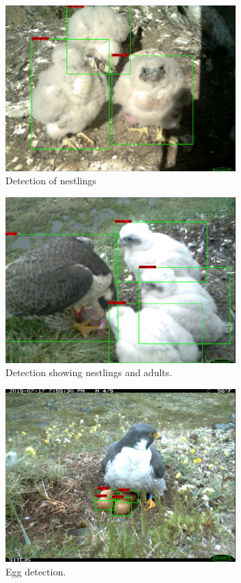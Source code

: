 \documentclass[journal]{IEEEtran}
\begin{document}
\begin{figure}[!tb]
	\centering
	\includegraphics[width=3.5in]{nestlings.jpg}
	\caption{Detection of nestlings}
	\label{nestlings}
\end{figure}


\begin{figure}[!tb]
	\centering
	\includegraphics[width=3.5in]{bothnestlingadults.jpg}
	\caption{Detection showing nestlings and adults.}
	\label{bothnestlingsadults}
\end{figure}


\begin{figure}[!tb]
	\centering
	\includegraphics[width=3.5in]{eggs.jpg}
	\caption{Egg detection.}
	\label{eggs}
\end{figure}
\end{document}
